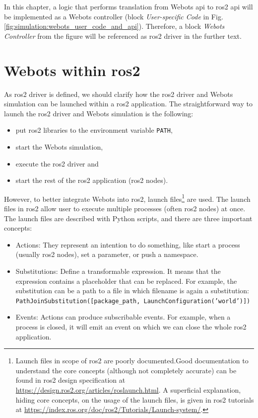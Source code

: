 In this chapter, a logic that performs translation from Webots \ac{api} to \ac{ros2} \ac{api} will be implemented as a Webots controller (block \textit{User-specific Code} in Fig. \ref{fig:simulation:webots_user_code_and_api}).
Therefore, a block \textit{Webots Controller} from the figure will be referenced as \ac{ros2} driver in the further text.

\section{Webots within \ac{ros2}}
As \ac{ros2} driver is defined, we should clarify how the \ac{ros2} driver and Webots simulation can be launched within a \ac{ros2} application. 
The straightforward way to launch the \ac{ros2} driver and Webots simulation is the following:
\begin{itemize}
    \item put \ac{ros2} libraries to the environment variable \texttt{PATH},
    \item start the Webots simulation,
    \item execute the \ac{ros2} driver and
    \item start the rest of the \ac{ros2} application (\ac{ros2} nodes).
\end{itemize}

However, to better integrate Webots into \ac{ros2}, launch files\footnote{Launch files in scope of \ac{ros2} are poorly documented.Good documentation to understand the core concepts (although not completely accurate) can be found in \ac{ros2} design specification at \url{https://design.ros2.org/articles/roslaunch.html}. A superficial explanation, hiding core concepts, on the usage of the launch files, is given in \ac{ros2} tutorials at \url{https://index.ros.org/doc/ros2/Tutorials/Launch-system/}.} are used.
The launch files in \ac{ros2} allow user to execute multiple processes (often \ac{ros2} nodes) at once.
The launch files are described with Python scripts, and there are three important concepts:
\begin{itemize}
    \item Actions: They represent an intention to do something, like start a process (usually \ac{ros2} nodes), set a parameter, or push a namespace. 
    \item Substitutions: Define a transformable expression. 
    It means that the expression contains a placeholder that can be replaced.
    For example, the substitution can be a path to a file in which filename is again a substitution: \\ \texttt{PathJoinSubstitution([package\_path, LaunchConfiguration('world')])}
    \item Events: Actions can produce subscribable events.
    For example, when a process is closed, it will emit an event on which we can close the whole \ac{ros2} application.
\end{itemize}


